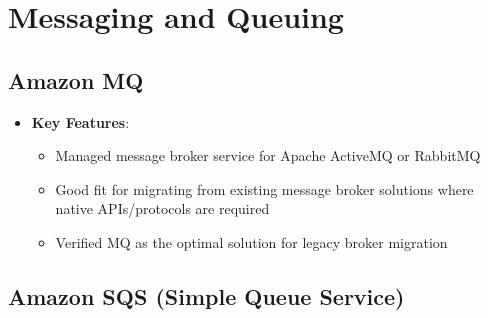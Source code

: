 \documentclass[11pt,a4paper]{report}
\begin{document}
\chapter{Messaging and Queuing}



\section{Amazon MQ}

\begin{itemize}
  \item \textbf{Key Features}:
\begin{itemize}
  \item Managed message broker service for Apache ActiveMQ or RabbitMQ
  \item Good fit for migrating from existing message broker solutions where native APIs/protocols are required
  \item Verified MQ as the optimal solution for legacy broker migration
\end{itemize}
\end{itemize}


\section{Amazon SQS (Simple Queue Service)}
\end{document}
